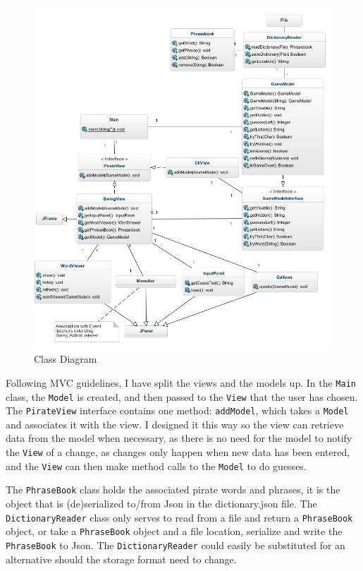 \documentclass[a4paper, 11pt]{article}
\begin{document}
\begin{figure}[H]
\centering
\includegraphics[scale=0.6]{./res/ClassDiagram.jpg}
\caption{Class Diagram}
\label{ModelClassDiagram}
\end{figure}

Following MVC guidelines, I have split the views and the models up. In the \texttt{Main} class, the \texttt{Model} is created, and then passed to the \texttt{View} that the user has chosen. The \texttt{PirateView} interface contains one method: \texttt{addModel}, which takes a \texttt{Model} and associates it with the view. I designed it this way so the view can retrieve data from the model when necessary, as there is no need for the model to notify the \texttt{View} of a change, as changes only happen when new data has been entered, and the \texttt{View} can then make method calls to the \texttt{Model} to do guesses.

The \texttt{PhraseBook} class holds the associated pirate words and phrases, it is the object that is (de)serialized to/from Json in the dictionary.json file. The \texttt{DictionaryReader} class only serves to read from a file and return a \texttt{PhraseBook} object, or take a \texttt{PhraseBook} object and a file location, serialize and write the \texttt{PhraseBook} to Json. The \texttt{DictionaryReader} could easily be substituted for an alternative should the storage format need to change. 
\end{document}
